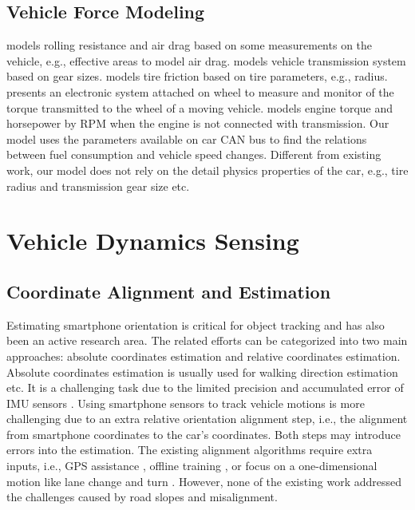 \subsection{Vehicle Force Modeling}

\cite{andersson2012online} models rolling resistance and air drag based on some measurements 
on the vehicle, e.g., effective areas to model air drag. 
\cite{zanasi2001dynamic} models vehicle transmission system based on gear sizes. 
\cite{canudas1999dynamic} models tire friction based on tire parameters, e.g., radius. 
\cite{brusamarello2010dynamic} presents an electronic system attached on wheel to measure and
monitor of the torque transmitted to the wheel of a moving vehicle.
\cite{vong2006prediction} models engine torque and horsepower by RPM when the
engine is not connected with transmission. 
Our model uses the parameters available on car CAN bus to find the relations between fuel consumption and vehicle speed changes.
Different from existing work, 
our model does not rely on the detail physics properties of the car, 
e.g., tire radius and transmission gear size etc.




\section{Vehicle Dynamics Sensing}

\subsection{Coordinate Alignment and Estimation}

Estimating smartphone orientation is critical 
for object tracking and has also been an active research area. 
The related efforts can be categorized into two main approaches:
absolute coordinates estimation and relative coordinates estimation.
Absolute coordinates estimation is usually used for 
walking direction estimation \cite{shen2013walkie, zhou2014use} etc. 
It is a challenging task due to the limited precision
and accumulated error of IMU sensors \cite{zhou2014use}. 
Using smartphone sensors to track vehicle motions 
is more challenging due to an extra relative orientation
alignment step, i.e., the alignment from smartphone coordinates
to the car's coordinates.
Both steps may introduce errors into the estimation. 
The existing alignment algorithms require
extra inputs, i.e., GPS assistance \cite{Mohan2008Nericell},
offline training \cite{yang2015low}, 
or focus on a one-dimensional motion like lane change and turn 
\cite{wang2013sensing, chen2015invisible}.
However, none of the existing work addressed the challenges caused
by road slopes and misalignment. 


